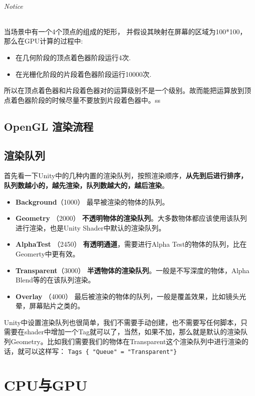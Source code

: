 \documentclass[UTF8,a4paper,12pt]{ctexbook}
\begin{document}
	
			\subparagraph{Notice}
				当场景中有一个4个顶点的组成的矩形， 并假设其映射在屏幕的区域为100*100，那么在GPU计算的过程中:
				\begin{itemize}
					\item 在几何阶段的顶点着色器阶段运行4次.
					\item 在光栅化阶段的片段着色器阶段运行10000次.	
				\end{itemize}
				
				所以在顶点着色器和片段着色器对的运算级别不是一个级别。故而能把运算放到顶点着色器阶段的时候尽量不要放到片段着色器中。ss
				
	\section{OpenGL 渲染流程}
			
	\section{渲染队列}
		首先看一下Unity中的几种内置的渲染队列，按照渲染顺序，\textbf{从先到后进行排序，队列数越小的，越先渲染，队列数越大的，越后渲染}。
		
			\begin{itemize}
				\item \textbf{Background}（1000） 最早被渲染的物体的队列。
				\item \textbf{Geometry} （2000） \textbf{不透明物体的渲染队列}。大多数物体都应该使用该队列进行渲染，也是Unity Shader中默认的渲染队列。
				\item \textbf{AlphaTest} （2450） \textbf{有透明通道}，需要进行Alpha Test的物体的队列，比在Geomerty中更有效。
				\item \textbf{Transparent}（3000） \textbf{半透物体的渲染队列}。一般是不写深度的物体，Alpha Blend等的在该队列渲染。
				\item \textbf{Overlay} （4000） 最后被渲染的物体的队列，一般是覆盖效果，比如镜头光晕，屏幕贴片之类的。
			\end{itemize}
		
		Unity中设置渲染队列也很简单，我们不需要手动创建，也不需要写任何脚本，只需要在shader中增加一个Tag就可以了，当然，如果不加，那么就是默认的渲染队列Geometry。比如我们需要我们的物体在Transparent这个渲染队列中进行渲染的话，就可以这样写：
		\verb|Tags { "Queue" = "Transparent"}|
	
\chapter{CPU与GPU}
	
\end{document}
